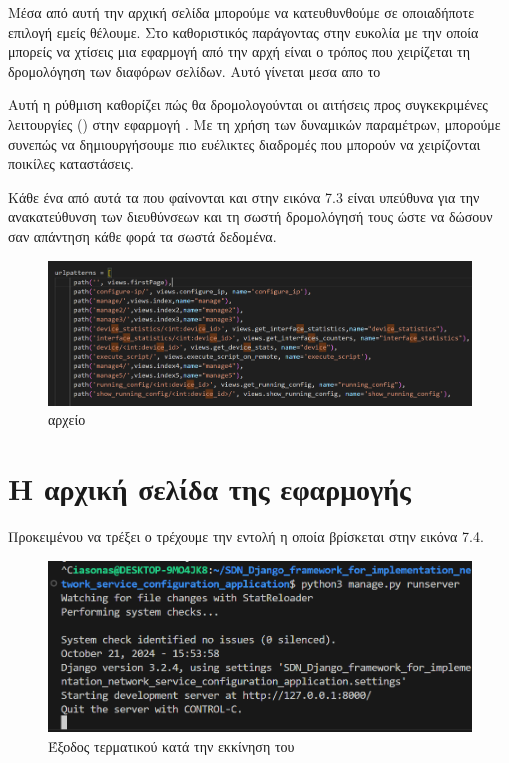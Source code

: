 \FloatBarrier

Μέσα από αυτή την αρχική σελίδα μπορούμε να κατευθυνθούμε σε οποιαδήποτε επιλογή εμείς θέλουμε.
Στο  καθοριστικός παράγοντας στην ευκολία με την οποία
μπορείς να χτίσεις μια εφαρμογή από την αρχή είναι ο τρόπος που χειρίζεται
τη δρομολόγηση των διαφόρων σελίδων. Αυτό γίνεται μεσα απο το 

Αυτή η ρύθμιση καθορίζει πώς θα δρομολογούνται οι 
αιτήσεις  προς συγκεκριμένες λειτουργίες () 
στην εφαρμογή . Με τη χρήση των δυναμικών παραμέτρων, 
μπορούμε συνεπώς να δημιουργήσουμε πιο ευέλικτες διαδρομές  
που μπορούν να χειρίζονται ποικίλες καταστάσεις. 

Κάθε ένα από αυτά τα  που φαίνονται και στην εικόνα 7.3
είναι υπεύθυνα για την ανακατεύθυνση των διευθύνσεων και τη σωστή δρομολόγησή
τους ώστε να δώσουν σαν απάντηση κάθε φορά τα σωστά δεδομένα.

\FloatBarrier
\begin{figure}[h]
	\centering
	\includegraphics[width=1.0\textwidth]{graphics/urls.png}
	\caption{  αρχείο}
\end{figure}

\FloatBarrier



\section{Η αρχική σελίδα της εφαρμογής}

Προκειμένου να τρέξει ο 
τρέχουμε την εντολή  η οποία βρίσκεται στην 
εικόνα 7.4.

\FloatBarrier

\begin{figure}[h]
	\centering
	\includegraphics[width=1.0\textwidth]{graphics/django_server_run.png}
	\caption{ Έξοδος τερματικού κατά την εκκίνηση του }
\end{figure}


